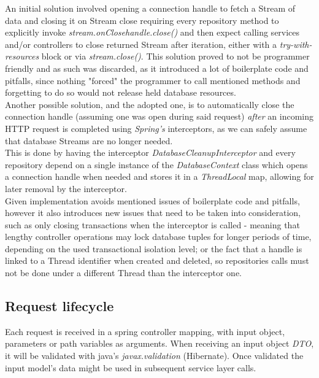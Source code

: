 An initial solution involved opening a connection handle to fetch a Stream of data and closing it on Stream close requiring every
repository method to explicitly invoke \textit{stream.onClose{handle.close()}} and then expect calling services and/or controllers to close
returned Stream after iteration, either with a \textit{try-with-resources} block or via \textit{stream.close()}. This solution proved to not be programmer
friendly and as such was discarded, as it introduced a lot of boilerplate code and pitfalls, since nothing "forced" the programmer to call mentioned
methods and forgetting to do so would not release held database resources.\\

Another possible solution, and the adopted one, is to automatically close the connection handle (assuming one was open during said request)
\textit{after} an incoming HTTP request is completed using \textit{Spring's} interceptors, as we can safely assume that database Streams are no longer needed.\\

This is done by having the interceptor \textit{DatabaseCleanupInterceptor} and every repository depend on a single instance of the \textit{DatabaseContext} class which opens a
connection handle when needed and stores it in a \textit{ThreadLocal} map, allowing for later removal by the interceptor.\\

Given implementation avoids mentioned issues of boilerplate code and pitfalls, however it also introduces new issues that need to be taken into consideration,
such as only closing transactions when the interceptor is called - meaning that lengthy controller operations may lock database tuples for longer periods of time,
depending on the used transactional isolation level;  or the fact that a handle is linked to a Thread identifier when created and deleted, so repositories calls must
not be done under a different Thread than the interceptor one.

\subsection{Request lifecycle}
Each request is received in a spring controller mapping, with input object,
parameters or path variables as arguments. When receiving an input object \textit{DTO},
it will be validated with java's \textit{javax.validation} (Hibernate).
Once validated the input model's data might be used in subsequent service layer calls.\\

